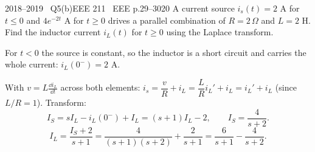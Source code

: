 \begin{qcard}{2018--2019 \textbullet\ Q5(b)}{EEE 211 \textbullet\ EEE p.29--30}{20}
A current source $i_s(t)=2$ A for $t\le0$ and $4e^{-2t}$ A for $t\ge0$ drives a parallel combination of $R=2\,\Omega$ and $L=2$ H. Find the inductor current $i_L(t)$ for $t\ge0$ using the Laplace transform.
\end{qcard}
\begin{solution}
 For $t<0$ the source is constant, so the inductor is a short circuit and carries the whole current: $i_L(0^-)=2$ A.

 With $v=L\frac{\dd i_L}{\dd t}$ across both elements: $i_s=\dfrac vR+i_L=\dfrac LRi_L'+i_L=i_L'+i_L$ (since $L/R=1$). Transform:
\[I_S=sI_L-i_L(0^-)+I_L=(s+1)I_L-2,\qquad I_S=\frac4{s+2}.\]
\[I_L=\frac{I_S+2}{s+1}=\frac{4}{(s+1)(s+2)}+\frac2{s+1}=\frac{6}{s+1}-\frac4{s+2}.\]
\end{solution}
